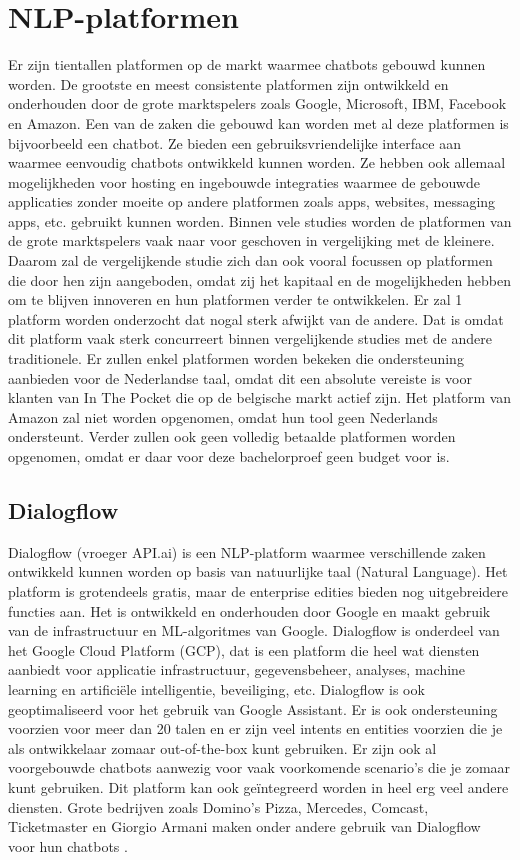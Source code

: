 \section{NLP-platformen}
\label{sec:nlp-platformen}

Er zijn tientallen platformen op de markt waarmee chatbots gebouwd kunnen worden. De grootste en meest consistente platformen zijn ontwikkeld en onderhouden door de grote marktspelers zoals Google, Microsoft, IBM, Facebook en Amazon. Een van de zaken die gebouwd kan worden met al deze platformen is bijvoorbeeld een chatbot. Ze bieden een gebruiksvriendelijke interface aan waarmee eenvoudig chatbots ontwikkeld kunnen worden. Ze hebben ook allemaal mogelijkheden voor hosting en ingebouwde integraties waarmee de gebouwde applicaties zonder moeite op andere platformen zoals apps, websites, messaging apps, etc. gebruikt kunnen worden. Binnen vele studies worden de platformen van de grote marktspelers vaak naar voor geschoven in vergelijking met de kleinere. Daarom zal de vergelijkende studie zich dan ook vooral focussen op platformen die door hen zijn aangeboden, omdat zij het kapitaal en de mogelijkheden hebben om te blijven innoveren en hun platformen verder te ontwikkelen. Er zal 1 platform worden onderzocht dat nogal sterk afwijkt van de andere. Dat is omdat dit platform vaak sterk concurreert binnen vergelijkende studies met de andere traditionele. Er zullen enkel platformen worden bekeken die ondersteuning aanbieden voor de Nederlandse taal, omdat dit een absolute vereiste is voor klanten van In The Pocket die op de belgische markt actief zijn. Het platform van Amazon zal niet worden opgenomen, omdat hun tool geen Nederlands ondersteunt. Verder zullen ook geen volledig betaalde platformen worden opgenomen, omdat er daar voor deze bachelorproef geen budget voor is.

\subsection{Dialogflow}
\label{subsec:nlp-platformen-dialogflow}

Dialogflow (vroeger API.ai) is een NLP-platform waarmee verschillende zaken ontwikkeld kunnen worden op basis van natuurlijke taal (Natural Language). Het platform is grotendeels gratis, maar de enterprise edities bieden nog uitgebreidere functies aan. Het is ontwikkeld en onderhouden door Google en maakt gebruik van de infrastructuur en ML-algoritmes van Google. Dialogflow is onderdeel van het Google Cloud Platform (GCP), dat is een platform die heel wat diensten aanbiedt voor applicatie infrastructuur, gegevensbeheer, analyses, machine learning en artificiële intelligentie, beveiliging, etc. Dialogflow is ook geoptimaliseerd voor het gebruik van Google Assistant. Er is ook ondersteuning voorzien voor meer dan 20 talen en er zijn veel intents en entities voorzien die je als ontwikkelaar zomaar out-of-the-box kunt gebruiken. Er zijn ook al voorgebouwde chatbots aanwezig voor vaak voorkomende scenario’s die je zomaar kunt gebruiken. Dit platform kan ook geïntegreerd worden in heel erg veel andere diensten. Grote bedrijven zoals Domino’s Pizza, Mercedes, Comcast, Ticketmaster en Giorgio Armani maken onder andere gebruik van Dialogflow voor hun chatbots \autocite{Dialogflow2020}. 

